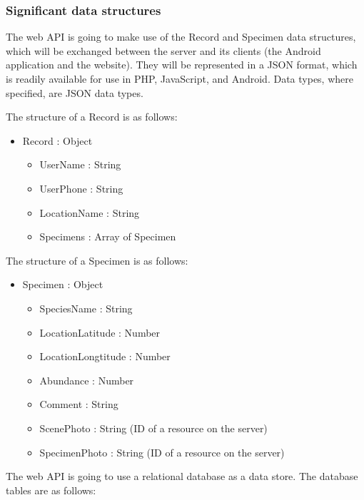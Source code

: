     \subsubsection{Significant data structures}

        The web API is going to make use of the Record and Specimen data structures, which will be exchanged between the server and its clients (the Android application and the website). They will be represented in a JSON format, which is readily available for use in PHP, JavaScript, and Android. Data types, where specified, are JSON data types. 

        The structure of a Record is as follows:
        \begin{itemize}
            \item Record : Object
            \begin{itemize}
                \item UserName : String
                \item UserPhone : String
                \item LocationName : String 
                \item Specimens : Array of Specimen
            \end{itemize}
        \end{itemize}

        The structure of a Specimen is as follows:
        \begin{itemize}
            \item Specimen : Object
            \begin{itemize}
                \item SpeciesName : String
                \item LocationLatitude : Number
                \item LocationLongtitude : Number
                \item Abundance : Number
                \item Comment : String
                \item ScenePhoto : String (ID of a resource on the server)
                \item SpecimenPhoto : String (ID of a resource on the server)
            \end{itemize}
        \end{itemize}

        The web API is going to use a relational database as a data store.
        The database tables are as follows:


